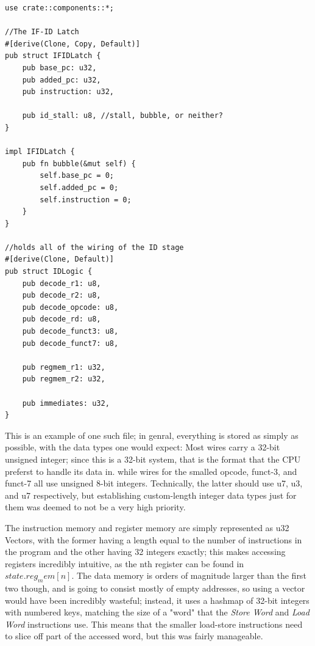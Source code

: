 \documentclass[12pt,twoside]{reedthesis}
\begin{document}
\begin{lstlisting}[caption={$decode.rs$, the file that holds ID-stage structs}]
use crate::components::*;

//The IF-ID Latch
#[derive(Clone, Copy, Default)]
pub struct IFIDLatch {
    pub base_pc: u32,
    pub added_pc: u32,
    pub instruction: u32,

    pub id_stall: u8, //stall, bubble, or neither?
}

impl IFIDLatch {
    pub fn bubble(&mut self) {
        self.base_pc = 0;
        self.added_pc = 0;
        self.instruction = 0;
    }
}

//holds all of the wiring of the ID stage
#[derive(Clone, Default)]
pub struct IDLogic {
    pub decode_r1: u8,
    pub decode_r2: u8,
    pub decode_opcode: u8,
    pub decode_rd: u8,
    pub decode_funct3: u8,
    pub decode_funct7: u8,

    pub regmem_r1: u32,
    pub regmem_r2: u32,

    pub immediates: u32,
}
\end{lstlisting}

This is an example of one such file; in genral, everything is stored as simply as possible, with the data types one would expect: Most wires carry a 32-bit unsigned integer; since this is a 32-bit system, that is the format that the CPU preferst to handle its data in. while wires for the smalled opcode, funct-3, and funct-7 all use unsigned 8-bit integers. Technically, the latter should use u7, u3, and u7 respectively, but establishing custom-length integer data types just for them was deemed to not be a very high priority.

The instruction memory and register memory are simply represented as u32 Vectors, with the former having a length equal to the number of instructions in the program and the other having 32 integers exactly; this makes accessing registers incredibly intuitive, as the nth register can be found in $state.reg_mem[n]$. The data memory is orders of magnitude larger than the first two though, and is going to consist mostly of empty addresses, so using a vector would have been incredibly wasteful; instead, it uses a hashmap of 32-bit integers with numbered keys, matching the size of a "word" that the \textit{Store Word} and \textit{Load Word} instructions use. This means that the smaller load-store instructions need to slice off part of the accessed word, but this was fairly manageable.
\end{document}
